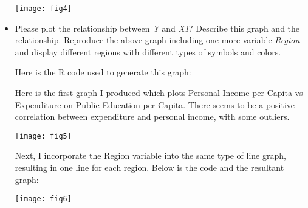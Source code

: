 \documentclass[12pt,letterpaper]{article}
\begin{document}
\begin{itemize}
		\texttt{[image: fig4]}
		
		\item
		Please plot the relationship between \emph{Y} and \emph{X1}? Describe this graph and the relationship. Reproduce the above graph including one more variable \emph{Region} and display different regions with different types of symbols and colors.
		
		Here is the R code used to generate this graph:
		  
		Here is the first graph I produced which plots Personal Income per Capita vs Expenditure on Public Education per Capita. There seems to be a positive correlation between expenditure and personal income, with some outliers. 
		
		\texttt{[image: fig5]}
		
		Next, I incorporate the Region variable into the same type of line graph, resulting in one line for each region. Below is the code and the resultant graph:
		
		  
		
		\texttt{[image: fig6]}
		
	\end{itemize}
	
\end{document}
